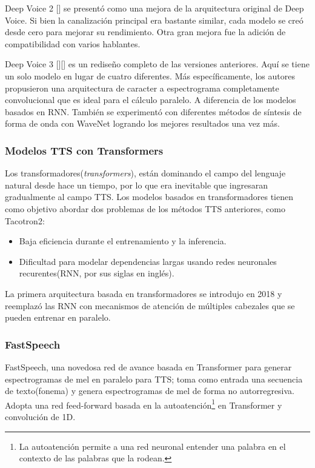 Deep Voice 2 [\cite{arik2018neural}]  se presentó como una mejora de la arquitectura original de Deep Voice. Si bien la canalización principal era bastante similar, cada modelo se creó desde cero para mejorar su rendimiento. Otra gran mejora fue la adición de compatibilidad con varios hablantes.

Deep Voice 3 [\cite{arik2018neural}][\cite{deep-voice3}] es un rediseño completo de las versiones anteriores. Aquí se tiene un solo modelo en lugar de cuatro diferentes. Más específicamente, los autores propusieron una arquitectura de caracter a espectrograma completamente convolucional que es ideal para el cálculo paralelo. A diferencia de los modelos basados en RNN. También se experimentó con diferentes métodos de síntesis de forma de onda con WaveNet logrando los mejores resultados una vez más.

\subsubsection{Modelos TTS con Transformers}
Los transformadores(\textit{transformers}), están dominando el campo del lenguaje natural desde hace un tiempo, por lo que era inevitable que ingresaran gradualmente al campo TTS. Los modelos basados en transformadores tienen como objetivo abordar dos problemas de los métodos TTS anteriores, como Tacotron2:

\begin{itemize}
	\item Baja eficiencia durante el entrenamiento y la inferencia.
	\item Dificultad para modelar dependencias largas usando redes neuronales recurentes(RNN, por sus siglas en inglés).
\end{itemize}
La primera arquitectura basada en transformadores se introdujo en 2018 y reemplazó las RNN con mecanismos de atención de múltiples cabezales que se pueden entrenar en paralelo.

\subsubsection{FastSpeech}

FastSpeech, una novedosa red de avance basada en Transformer para generar espectrogramas de mel en paralelo para TTS; toma como entrada una secuencia de texto(fonema) y genera espectrogramas de mel de forma no autorregresiva. Adopta una red feed-forward basada en la autoatención\footnote{La autoatención permite a una red neuronal entender una palabra en el contexto de las palabras que la rodean.} en Transformer y convolución de 1D. 

